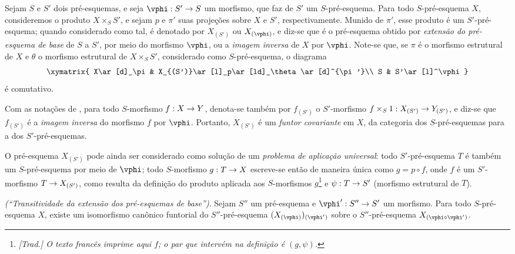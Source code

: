 \documentclass[oneside]{amsart}
\makeatletter
\newcommand{\ega@arrow}[2]{\mathchoice{#1}{#2}{#2}{#2}}
\renewcommand{\to}{\ega@arrow{\longrightarrow}{\rightarrow}}
\let\EGAOriginalLabel\label
\renewcommand{\label}[1]{\phantomsection\EGAOriginalLabel{#1}}
\makeatother
\begin{document}
\begin{env}[3.3.6]
\label{I.3.3.6}
Sejam $S$ e $S'$ dois pré-esquemas, e seja $\vphi:S'\to S$ um morfismo, que
faz de $S'$ um $S$-pré-esquema. Para todo $S$-pré-esquema $X$, consideremos o
produto $X\times_S S'$, e sejam $p$ e $\pi'$ suas projeções sobre $X$ e $S'$,
respectivamente. Munido de $\pi'$, esse produto é um $S'$-pré-esquema; quando
considerado como tal, é denotado por $X_{(S')}$ ou $X_{(\vphi)}$, e diz-se que
é o pré-esquema obtido por \emph{extensão do pré-esquema de base} de $S$ a
$S'$, por meio do morfismo $\vphi$, ou a \emph{imagem inversa} de $X$ por
$\vphi$. Note-se que, se $\pi$ é o morfismo estrutural de $X$ e $\theta$ o
morfismo estrutural de $X\times_S S'$, considerado como $S$-pré-esquema, o
diagrama
\[
  \xymatrix{
    X\ar[d]_\pi &
    X_{(S')}\ar[l]_p\ar[ld]_\theta\ar[d]^{\pi'}\\
    S &
    S'\ar[l]^\vphi
  }
\]
é comutativo.
\end{env}

\begin{env}[3.3.7]
\label{I.3.3.7}
Com as notações de , para todo $S$-morfismo $f:X\to Y$,
denota-se também por $f_{(S')}$ o $S'$-morfismo
$f\times_S 1:X_{(S')}\to Y_{(S')}$, e diz-se que $f_{(S')}$ é a
\emph{imagem inversa} do morfismo $f$ por $\vphi$. Portanto, $X_{(S')}$ é um
\emph{funtor covariante} em $X$, da categoria dos $S$-pré-esquemas para a dos
$S'$-pré-esquemas.
\end{env}

\begin{env}[3.3.8]
\label{I.3.3.8}
O pré-esquema $X_{(S')}$ pode ainda ser considerado como solução de um
\emph{problema de aplicação universal}: todo $S'$-pré-esquema $T$ é também um
$S$-pré-esquema por meio de $\vphi$; todo $S$-morfismo $g:T\to X$ escreve-se
então de maneira única como $g=p\circ f$, onde $f$ é um $S'$-morfismo
$T\to X_{(S')}$, como resulta da definição do produto aplicada aos
$S$-morfismos $g$\footnote{\emph{[Trad.] O texto francês imprime aqui $f$; o
par que intervém na definição é $(g,\psi)$.}} e $\psi:T\to S'$ (morfismo
estrutural de $T$).
\end{env}

\begin{proposition}[3.3.9]
\label{I.3.3.9}
\emph{(``Transitividade da extensão dos pré-esquemas de base'')}. Sejam
$S''$ um pré-esquema e $\vphi':S''\to S'$ um morfismo. Para todo
$S$-pré-esquema $X$, existe um isomorfismo canônico funtorial do
$S''$-pré-esquema $(X_{(\vphi)})_{(\vphi')}$ sobre o $S''$-pré-esquema
$X_{(\vphi\circ\vphi')}$.
\end{proposition}
\end{document}

